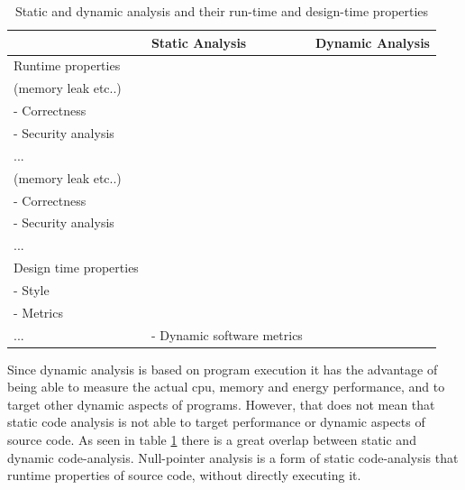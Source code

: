 \documentclass{report}
\begin{document}
\begin{table}[h!]
\centering
\begin{tabularx}{\textwidth}{|X|X|X|}
\hline
                                & Static Analysis                                                                                        & Dynamic Analysis                                                                                       \\ \hline
Runtime properties     & \begin{tabular}[c]{@{}l@{}}- Performance \\(memory leak etc..)\\ - Correctness\\ - Security analysis\\ ...\end{tabular} & \begin{tabular}[c]{@{}l@{}}- Performance \\(memory leak etc..)\\ - Correctness\\ - Security analysis\\ ...\end{tabular} \\ \hline
Design time properties & \begin{tabular}[c]{@{}l@{}}- Design principles \\ - Style\\ - Metrics\\ ...\end{tabular}                              & - Dynamic software metrics                                                                                            \\ \hline
\end{tabularx}
\caption{Static and dynamic analysis and their run-time and design-time properties}
\label{table:static-dynamic}
\end{table}

Since dynamic analysis is based on program execution it has the advantage of being able to measure the actual \gls{cpu}, memory and energy performance, and to target other dynamic aspects of programs. However, that does not mean that static code analysis is not able to target performance or dynamic aspects of source code. As seen in table \ref{table:static-dynamic} there is a great overlap between static and dynamic code-analysis. Null-pointer analysis is a form of static code-analysis that runtime properties of source code, without directly executing it.
\end{document}
